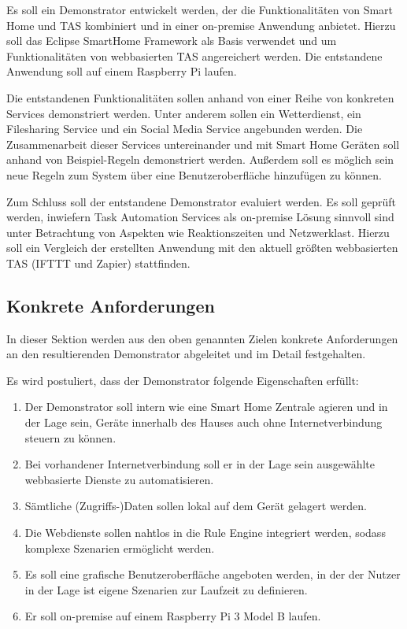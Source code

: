 Es soll ein Demonstrator entwickelt werden, der die Funktionalitäten von Smart Home und TAS kombiniert und in einer on-premise Anwendung anbietet. Hierzu soll das Eclipse SmartHome Framework als Basis verwendet und um Funktionalitäten von webbasierten TAS angereichert werden. Die entstandene Anwendung soll auf einem Raspberry Pi\cite{rasp} laufen.

Die entstandenen Funktionalitäten sollen anhand von einer Reihe von konkreten Services demonstriert werden. Unter anderem sollen ein Wetterdienst, ein Filesharing Service und ein Social Media Service angebunden werden. Die Zusammenarbeit dieser Services untereinander und mit Smart Home Geräten soll anhand von Beispiel-Regeln demonstriert werden. Außerdem soll es möglich sein neue Regeln zum System über eine Benutzeroberfläche hinzufügen zu können.

Zum Schluss soll der entstandene Demonstrator evaluiert werden. Es soll geprüft werden, inwiefern Task Automation Services als on-premise Lösung sinnvoll sind unter Betrachtung von Aspekten wie Reaktionszeiten und Netzwerklast. Hierzu soll ein Vergleich der erstellten Anwendung mit den aktuell größten webbasierten TAS (IFTTT und Zapier) stattfinden.

\subsection{Konkrete Anforderungen}
\label{sec:anforderungen}
In dieser Sektion werden aus den oben genannten Zielen konkrete Anforderungen an den resultierenden Demonstrator abgeleitet und im Detail festgehalten.

Es wird postuliert, dass der Demonstrator folgende Eigenschaften erfüllt:
\begin{enumerate}

\item Der Demonstrator soll intern wie eine Smart Home Zentrale agieren und in der Lage sein, Geräte innerhalb des Hauses auch ohne Internetverbindung steuern zu können.
\item Bei vorhandener Internetverbindung soll er in der Lage sein ausgewählte  webbasierte Dienste zu automatisieren.
\item Sämtliche (Zugriffs-)Daten sollen lokal auf dem Gerät gelagert werden. 
\item Die Webdienste sollen nahtlos in die Rule Engine integriert werden, sodass komplexe Szenarien ermöglicht werden.
\item Es soll eine grafische Benutzeroberfläche angeboten werden, in der der Nutzer in der Lage ist eigene Szenarien zur Laufzeit zu definieren.
\item Er soll on-premise auf einem Raspberry Pi 3 Model B laufen.

\end{enumerate}

